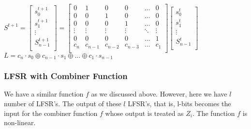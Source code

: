\documentclass[11pt]{article}
\begin{document}
\begin{center}
    $ S^{t+1} = 
    \begin{bmatrix}
        s_0^{t+1}\\
        s_1^{t+1}\\
        \vdots\\
        S_{n-1}^{t+1}\\
    \end{bmatrix}
    =
    \begin{bmatrix}
        0 & 1 & 0 & 0 & \hdots & 0\\
        0 & 0 & 1 & 0 & \hdots & 0\\
        0 & 0 & 0 & 1 & \hdots & 0\\
        \vdots & \vdots & \vdots & \vdots & \ddots & \vdots\\
        0 & 0 & 0 & 0 & \hdots & 1\\
        c_n & c_{n-1} & c_{n-2} & c_{n-3} & \hdots & c_1\\
    \end{bmatrix}
    \begin{bmatrix}
        s_0^{t}\\
        s_1^{t}\\
        \vdots\\
        S_{n-1}^{t}\\
    \end{bmatrix}
    $\\
    \vspace{2mm}
    $L = c_n\cdot s_0 \oplus c_{n-1} \cdot s_1 \oplus \hdots \oplus c_1\cdot s_{n-1}$
\end{center}

\subsubsection{LFSR with Combiner Function}
We have a similar function $f$ as we discussed above. However, here we have $l$ number of LFSR's. The output of these $l$ LFSR's, that is, l-bits becomes the input for the combiner function $f$ whose output is treated as $Z_i$. The function $f$ is non-linear.
\end{document}
